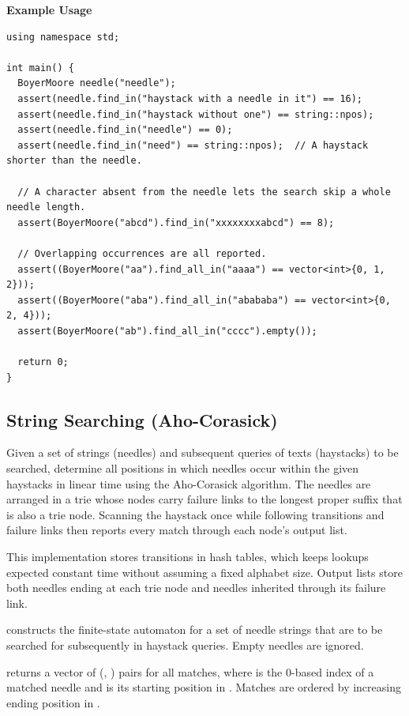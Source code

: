 \textbf{Example Usage}\par
\begin{lstlisting}[style=cpp]
using namespace std;

int main() {
  BoyerMoore needle("needle");
  assert(needle.find_in("haystack with a needle in it") == 16);
  assert(needle.find_in("haystack without one") == string::npos);
  assert(needle.find_in("needle") == 0);
  assert(needle.find_in("need") == string::npos);  // A haystack shorter than the needle.

  // A character absent from the needle lets the search skip a whole needle length.
  assert(BoyerMoore("abcd").find_in("xxxxxxxxabcd") == 8);

  // Overlapping occurrences are all reported.
  assert((BoyerMoore("aa").find_all_in("aaaa") == vector<int>{0, 1, 2}));
  assert((BoyerMoore("aba").find_all_in("abababa") == vector<int>{0, 2, 4}));
  assert(BoyerMoore("ab").find_all_in("cccc").empty());

  return 0;
}
\end{lstlisting}
\subsection{String Searching (Aho-Corasick)}
\label{sec:3.3.4}
Given a set of strings (needles) and subsequent queries of texts (haystacks) to be searched, determine all positions in which needles occur within the given haystacks in linear time using the Aho-Corasick algorithm. The needles are arranged in a trie whose nodes carry failure links to the longest proper suffix that is also a trie node. Scanning the haystack once while following transitions and failure links then reports every match through each node's output list.

This implementation stores transitions in hash tables, which keeps lookups expected constant time without assuming a fixed alphabet size. Output lists store both needles ending at each trie node and needles inherited through its failure link.

\begin{compactitem}
  \item {} constructs the finite-state automaton for a set of needle strings that are to be searched for subsequently in haystack queries. Empty needles are ignored.
  \item {} returns a vector of (, ) pairs for all matches, where  is the 0-based index of a matched needle and  is its starting position in . Matches are ordered by increasing ending position in .
\end{compactitem}

